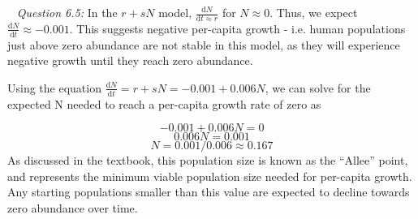 \documentclass[12pt]{article}
\begin{document}
~\newline
\textit{Question 6.5:}
\newline
In the $r+sN$ model, $\frac{\mathrm{d}N}{\mathrm{d}t \approx r}$ for $N \approx 0$. Thus, we expect $\frac{\mathrm{d}N}{\mathrm{d}t} \approx -0.001$. This suggests negative per-capita growth - i.e. human populations just above zero abundance are not stable in this model, as they will experience negative growth until they reach zero abundance.

Using the equation $\frac{\mathrm{d}N}{\mathrm{d}t} = r + sN = -0.001 + 0.006N$, we can solve for the expected N needed to reach a per-capita growth rate of zero as

$$-0.001 + 0.006N = 0$$
$$0.006N = 0.001$$
$$N = 0.001/0.006 \approx 0.167$$
As discussed in the textbook, this population size is known as the ``Allee'' point, and represents the minimum viable population size needed for per-capita growth. Any starting populations smaller than this value are expected to decline towards zero abundance over time.


~\newline
\end{document}
